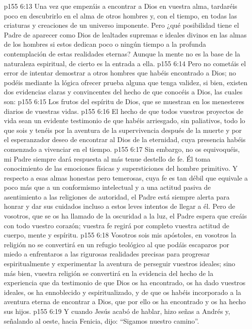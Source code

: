 \vs p155 6:13 Una vez que empezáis a encontrar a Dios en vuestra alma, tardaréis poco en descubrirlo en el alma de otros hombres y, con el tiempo, en todas las criaturas y creaciones de un universo imponente. Pero ¿qué posibilidad tiene el Padre de aparecer como Dios de lealtades supremas e ideales divinos en las almas de los hombres si estos dedican poco o ningún tiempo a la profunda contemplación de estas realidades eternas? Aunque la mente no es la base de la naturaleza espiritual, de cierto es la entrada a ella.
\vs p155 6:14 Pero no cometáis el error de intentar demostrar a otros hombres que habéis encontrado a Dios; no podéis mediante la lógica ofrecer prueba alguna que tenga validez, si bien, existen dos evidencias claras y convincentes del hecho de que conocéis a Dios, las cuales son:
\vs p155 6:15 Los frutos del espíritu de Dios, que se muestran en los menesteres diarios de vuestras vidas.
\vs p155 6:16 El hecho de que todos vuestros proyectos de vida sean un evidente testimonio de que habéis arriesgado, sin paliativos, todo lo que sois y tenéis por la aventura de la supervivencia después de la muerte y por el esperanzador deseo de encontrar al Dios de la eternidad, cuya presencia habéis comenzado a vivenciar en el tiempo.
\vs p155 6:17 \pc Sin embargo, no os equivoquéis, mi Padre siempre dará respuesta al más tenue destello de fe. Él toma conocimiento de las emociones físicas y supersticiones del hombre primitivo. Y respecto a esas almas honestas pero temerosas, cuya fe es tan débil que equivale a poco más que a un conformismo intelectual y a una actitud pasiva de asentimiento a las religiones de autoridad, el Padre está siempre alerta para honrar y dar sus cuidados incluso a estos leves intentos de llegar a él. Pero de vosotros, que se os ha llamado de la oscuridad a la luz, el Padre espera que creáis con todo vuestro corazón; vuestra fe regirá por completo vuestra actitud de cuerpo, mente y espíritu.
\vs p155 6:18 Vosotros sois mis apóstoles, en vosotros la religión no se convertirá en un refugio teológico al que podáis escaparos por miedo a enfrentaros a las rigurosas realidades precisas para progresar espiritualmente y experimentar la aventura de perseguir vuestros ideales; sino más bien, vuestra religión se convertirá en la evidencia del hecho de la experiencia que da testimonio de que Dios os ha encontrado, os ha dado vuestros ideales, os ha ennoblecido y espiritualizado, y de que os habéis incorporado a la aventura eterna de encontrar a Dios, que por ello os ha encontrado y os ha hecho sus hijos.
\vs p155 6:19 \pc Y cuando Jesús acabó de hablar, hizo señas a Andrés y, señalando al oeste, hacia Fenicia, dijo: “Sigamos nuestro camino”.
